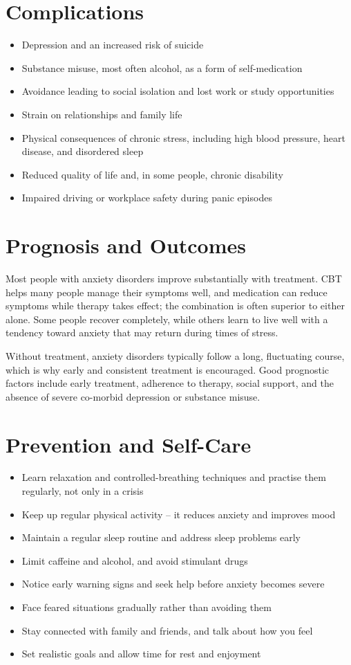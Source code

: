 \section*{Complications}
\begin{itemize}
    \item Depression and an increased risk of suicide
    \item Substance misuse, most often alcohol, as a form of self-medication
    \item Avoidance leading to social isolation and lost work or study opportunities
    \item Strain on relationships and family life
    \item Physical consequences of chronic stress, including high blood pressure, heart disease, and disordered sleep
    \item Reduced quality of life and, in some people, chronic disability
    \item Impaired driving or workplace safety during panic episodes
\end{itemize}

\section*{Prognosis and Outcomes}
Most people with anxiety disorders improve substantially with treatment. CBT helps many people manage their symptoms well, and medication can reduce symptoms while therapy takes effect; the combination is often superior to either alone. Some people recover completely, while others learn to live well with a tendency toward anxiety that may return during times of stress.

Without treatment, anxiety disorders typically follow a long, fluctuating course, which is why early and consistent treatment is encouraged. Good prognostic factors include early treatment, adherence to therapy, social support, and the absence of severe co-morbid depression or substance misuse.

\section*{Prevention and Self-Care}
\begin{itemize}
    \item Learn relaxation and controlled-breathing techniques and practise them regularly, not only in a crisis
    \item Keep up regular physical activity -- it reduces anxiety and improves mood
    \item Maintain a regular sleep routine and address sleep problems early
    \item Limit caffeine and alcohol, and avoid stimulant drugs
    \item Notice early warning signs and seek help before anxiety becomes severe
    \item Face feared situations gradually rather than avoiding them
    \item Stay connected with family and friends, and talk about how you feel
    \item Set realistic goals and allow time for rest and enjoyment
\end{itemize}

